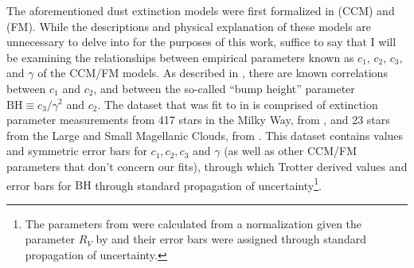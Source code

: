 The aforementioned dust extinction models were first formalized in \textcite{cardelli1989relationship} (CCM) and \textcite{fitzpatrick1988analysis} (FM). While the descriptions and physical explanation of these models are unnecessary to delve into for the purposes of this work, suffice to say that I will be examining the relationships between empirical parameters known as $c_1$, $c_2$, $c_3$, and $\gamma$ of the CCM/FM models. As described in \textcite{trotter}, there are known correlations between $c_1$ and $c_2$, and between the so-called ``bump height'' parameter $\text{BH}\equiv c_3/\gamma^2$ and $c_2$. The dataset that was fit to in \textcite{trotter} is comprised of extinction parameter measurements from 417 stars in the Milky Way, from \textcite{valencic04}, and 23 stars from the Large and Small Magellanic Clouds, from \textcite{gordon03}. This dataset contains values and symmetric error bars for $c_1, c_2, c_3$ and $\gamma$ (as well as other CCM/FM parameters that don't concern our fits), through which Trotter derived values and error bars for $\text{BH}$ through standard propagation of uncertainty\footnote{The parameters from \textcite{valencic04} were calculated from a normalization given the parameter $R_V$ by \textcite{trotter} and their error bars were assigned through standard propagation of uncertainty.}. 

